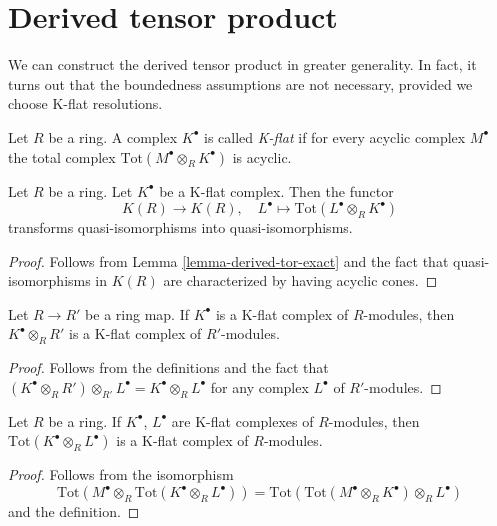 \section{Derived tensor product}
\label{section-derived-tensor-product}

\noindent
We can construct the derived tensor product in greater generality.
In fact, it turns out that the boundedness assumptions are not
necessary, provided we choose K-flat resolutions.

\begin{definition}
\label{definition-K-flat}
Let $R$ be a ring. A complex $K^\bullet$ is called {\it K-flat}
if for every acyclic complex $M^\bullet$ the total complex
$\text{Tot}(M^\bullet \otimes_R K^\bullet)$ is acyclic.
\end{definition}

\begin{lemma}
\label{lemma-K-flat-quasi-isomorphism}
Let $R$ be a ring. Let $K^\bullet$ be a K-flat complex.
Then the functor
$$
K(R) \longrightarrow K(R), \quad
L^\bullet \longmapsto \text{Tot}(L^\bullet \otimes_R K^\bullet)
$$
transforms quasi-isomorphisms into quasi-isomorphisms.
\end{lemma}

\begin{proof}
Follows from
Lemma \ref{lemma-derived-tor-exact}
and the fact that quasi-isomorphisms in $K(R)$
are characterized by having acyclic cones.
\end{proof}

\begin{lemma}
\label{lemma-base-change-K-flat}
Let $R \to R'$ be a ring map. If $K^\bullet$ is a K-flat complex
of $R$-modules, then $K^\bullet \otimes_R R'$ is a K-flat complex
of $R'$-modules.
\end{lemma}

\begin{proof}
Follows from the definitions and the fact that
$(K^\bullet \otimes_R R') \otimes_{R'} L^\bullet =
K^\bullet \otimes_R L^\bullet$ for any complex
$L^\bullet$ of $R'$-modules.
\end{proof}

\begin{lemma}
\label{lemma-tensor-product-K-flat}
Let $R$ be a ring. If $K^\bullet$, $L^\bullet$ are K-flat complexes
of $R$-modules, then $\text{Tot}(K^\bullet \otimes_R L^\bullet)$ is a
K-flat complex of $R$-modules.
\end{lemma}

\begin{proof}
Follows from the isomorphism
$$
\text{Tot}(M^\bullet \otimes_R \text{Tot}(K^\bullet \otimes_R L^\bullet))
=
\text{Tot}(\text{Tot}(M^\bullet \otimes_R K^\bullet) \otimes_R L^\bullet)
$$
and the definition.
\end{proof}

